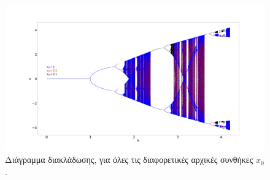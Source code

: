 \begin{figure}[ht]
	\centering
	\includegraphics[width=1\linewidth]{LateX images/sine q=-0.5/g11}
	\caption{Διάγραμμα διακλάδωσης, για όλες τις διαφορετικές αρχικές συνθήκες $x_0$.}
	\label{f:g57}
\end{figure}

